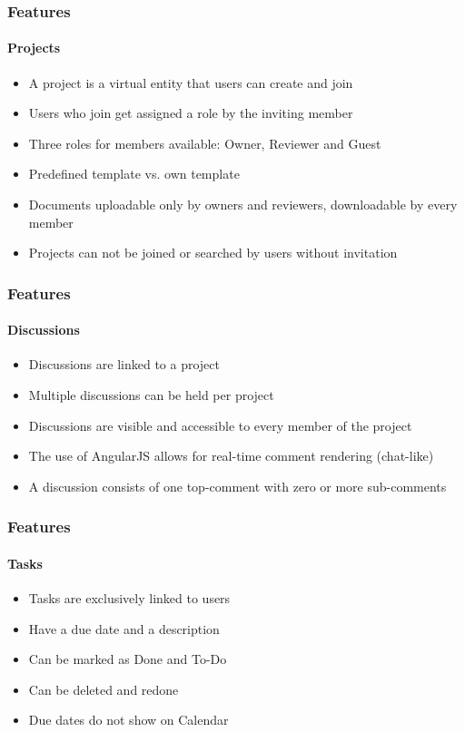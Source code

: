 \documentclass{beamer}
\begin{document}
\begin{frame}
\frametitle{Features}
\framesubtitle{Projects}
	\begin{itemize}
		\item A project is a virtual entity that users can create and join
		\item Users who join get assigned a role by the inviting member
		\item Three roles for members available: Owner, Reviewer and Guest
		\item Predefined template vs. own template
		\item Documents uploadable only by owners and reviewers, downloadable by every member
		\item Projects can not be joined or searched by users without invitation
	\end{itemize}
\end{frame}

\begin{frame}
\frametitle{Features}
\framesubtitle{Discussions}
	\begin{itemize}
		\item Discussions are linked to a project
		\item Multiple discussions can be held per project
		\item Discussions are visible and accessible to every member of the project
		\item The use of AngularJS allows for real-time comment rendering (chat-like)
		\item A discussion consists of one top-comment with zero or more sub-comments
	\end{itemize}
\end{frame}

\begin{frame}
\frametitle{Features}
\framesubtitle{Tasks}
	\begin{itemize}
		\item Tasks are exclusively linked to users
		\item Have a due date and a description
		\item Can be marked as Done and To-Do
		\item Can be deleted and redone
		\item Due dates do not show on Calendar
	\end{itemize}
\end{frame}
\end{document}

